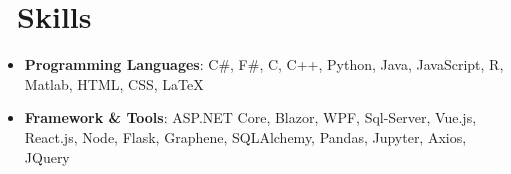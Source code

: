 \documentclass{resume}
\begin{document}
\section{\texorpdfstring{\faCogs}{}\ Skills}
\begin{itemize}[parsep=0.5ex]
  \item \textbf{Programming Languages}: C\#, F\#, C, C++, Python, Java, JavaScript, R, Matlab, HTML, CSS, \LaTeX
  \item \textbf{Framework \& Tools}: ASP.NET Core, Blazor, WPF, Sql-Server, Vue.js, React.js, Node, Flask, Graphene, SQLAlchemy, Pandas, Jupyter, Axios, JQuery
\end{itemize}



%
%
\end{document}
